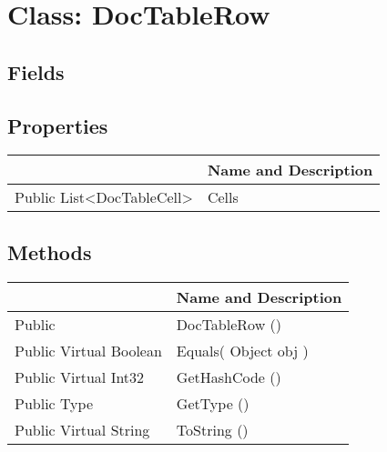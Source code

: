 \documentclass[11pt, oneside, a4paper]{book}
\begin{document}
\hypertarget{SoftwareEngineeringTools.{}Documentation.{}DocTableRow}{}
\section{Class: DocTableRow}

\subsection{Fields}

\subsection{Properties}
\begin{center}
\begin{tabular}{| p{3cm} | p{12cm} | }
\hline
\textbf{ } & \textbf{ Name and Description}\\
\hline
 Public  List<DocTableCell> &  Cells\hypertarget{SoftwareEngineeringTools.{}Documentation.{}DocTableRow.{}Cells}{}\\
\hline
\end{tabular}
\end{center}

\subsection{Methods}
\begin{center}
\begin{tabular}{| p{3cm} | p{12cm} | }
\hline
\textbf{ } & \textbf{ Name and Description}\\
\hline
 Public  &  DocTableRow ()\hypertarget{SoftwareEngineeringTools.{}Documentation.{}DocTableRow.{}DocTableRow}{}\\
\hline
 Public  Virtual  Boolean &  Equals(\hypertarget{SoftwareEngineeringTools.{}Documentation.{}DocTableRow.{}Equals\_Object}{} Object  obj  )\\
\hline
 Public  Virtual  Int32 &  GetHashCode ()\hypertarget{SoftwareEngineeringTools.{}Documentation.{}DocTableRow.{}GetHashCode}{}\\
\hline
 Public  Type &  GetType ()\hypertarget{SoftwareEngineeringTools.{}Documentation.{}DocTableRow.{}GetType}{}\\
\hline
 Public  Virtual  String &  ToString ()\hypertarget{SoftwareEngineeringTools.{}Documentation.{}DocTableRow.{}ToString}{}\\
\hline
\end{tabular}
\end{center}
 
\end{document}
